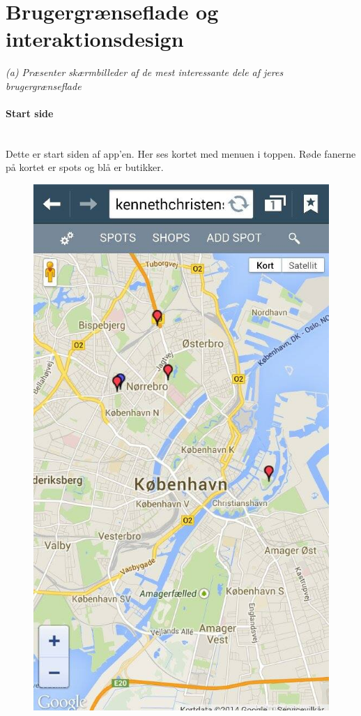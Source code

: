 \documentclass[12pt]{article}
\begin{document}
\section{Brugergrænseflade og interaktionsdesign}
\textit{(a) Præsenter skærmbilleder af de mest interessante dele af jeres brugergrænseflade}

\paragraph{Start side}\mbox{}\\
Dette er start siden af app'en. Her ses kortet med menuen i toppen. Røde fanerne på kortet er spots og blå er butikker.\\
\begin{figure}[h]
\includegraphics[scale = 0.3]{mobil1}
\end{figure}
\end{document}
